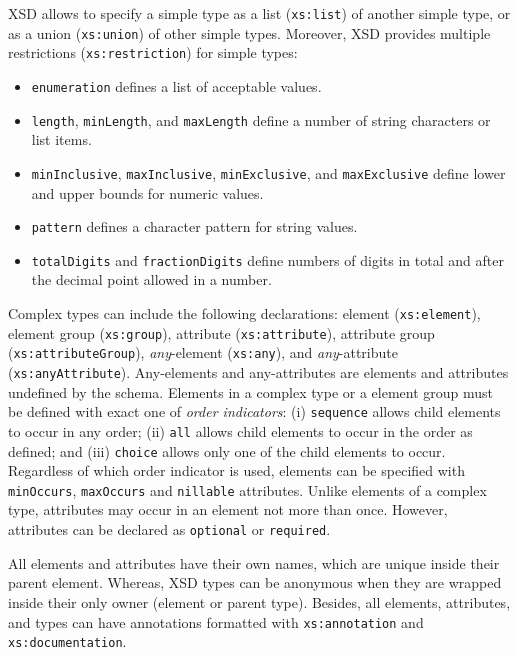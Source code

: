 XSD allows to specify a simple type as a list (\texttt{xs:list}) of another simple type, or as a union (\texttt{xs:union}) of other simple types.
Moreover, XSD provides multiple restrictions (\texttt{xs:restriction}) for simple types:
\begin{itemize}
    \item \texttt{enumeration} defines a list of acceptable values.
    \item \texttt{length}, \texttt{min\-Length}, and \texttt{max\-Length} define a number of string characters or list items.
    \item \texttt{min\-Inclu\-sive}, \texttt{max\-Inclu\-sive}, \texttt{min\-Exclu\-sive}, and \texttt{max\-Exclu\-sive} define lower and upper bounds for numeric values.
    \item \texttt{pattern} defines a character pattern for string values.
    \item \texttt{totalDigits} and \texttt{fractionDigits} define numbers of digits in total and after the decimal point allowed in a number.
\end{itemize}



Complex types can include the following declarations: element (\texttt{xs:element}), element group (\texttt{xs:group}), attribute (\texttt{xs:attribute}), attribute group (\texttt{xs:attri\-bute\-Group}), \emph{any}-element (\texttt{xs:any}), and \emph{any}-attribute (\texttt{xs:anyAttribute}).
Any-elements and any-attributes are elements and attributes undefined by the schema.
Elements in a complex type or a element group must be defined with exact one of \emph{order indicators}:
(i) \texttt{sequence} allows child elements to occur in any order;
(ii) \texttt{all} allows child elements to occur in the order as defined;
and (iii) \texttt{choice} allows only one of the child elements to occur.
Regardless of which order indicator is used, elements can be specified with \texttt{min\-Occurs}, \texttt{max\-Occurs} and \texttt{nillable} attributes.
Unlike elements of a complex type, attributes may occur in an element not more than once.
However, attributes can be declared as \texttt{optional} or \texttt{required}.


All elements and attributes have their own names, which are unique inside their parent element.
Whereas, XSD types can be anonymous when they are wrapped inside their only owner (element or parent type).
Besides, all elements, attributes, and types can have annotations formatted with \texttt{xs:annotation} and \texttt{xs:documentation}.

